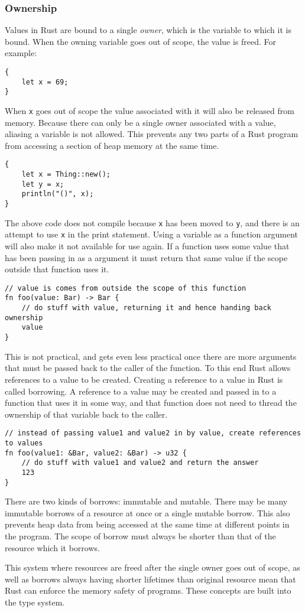 \subsubsection{Ownership}\label{sec:regions}
Values in Rust are bound to a single \textit{owner}, which is the variable to
which it is bound. When the owning variable goes out of scope, the value is
freed. For example:
\begin{lstlisting}[nolol, label={lst:rustScope}]
{
    let x = 69;
}
\end{lstlisting}
When \lstinline{x} goes out of scope the value associated with it will also be
released from memory. Because there can only be a single owner associated with
a value, aliasing a variable is not allowed. This prevents any two parts
of a Rust program from accessing a section of heap memory at the same time.
\begin{lstlisting}[nolol, label={lst:rustScope}]
{
    let x = Thing::new();
    let y = x;
    println("()", x);
}
\end{lstlisting}
The above code does not compile because \lstinline{x} has been moved to
\lstinline{y}, and there is an attempt to use \lstinline{x} in the print
statement. Using a variable as a function argument will also make it not
available for use again. If a function uses some value that has been passing in
as a argument it must return that same value if the scope outside that
function uses it.
\begin{lstlisting}[nolol, label={lst:rustScope}]
// value is comes from outside the scope of this function
fn foo(value: Bar) -> Bar {
    // do stuff with value, returning it and hence handing back ownership
    value
}
\end{lstlisting}
This is not practical, and gets even less practical once there are more
arguments that must be passed back to the caller of the function. To this end
Rust allows references to a value to be created. Creating a reference to a value
in Rust is called borrowing. A reference to a value may be created and passed
in to a function that uses it in some way, and that function does not need to
thread the ownership of that variable back to the caller.
\begin{lstlisting}[nolol, label={lst:rustScope}]
// instead of passing value1 and value2 in by value, create references to values
fn foo(value1: &Bar, value2: &Bar) -> u32 {
    // do stuff with value1 and value2 and return the answer
    123
}
\end{lstlisting}
There are two kinds of borrows: immutable and mutable. There may be many
immutable borrows of a resource at once or a single mutable borrow. This also
prevents heap data from being accessed at the same time at different points in
the program. The scope of borrow must always be shorter than that of the
resource which it borrows. 

This system where resources are freed after the single owner goes out of scope,
as well as borrows always having shorter lifetimes than original resource
mean that Rust can enforce the memory safety of programs. These concepts are
built into the type system.
